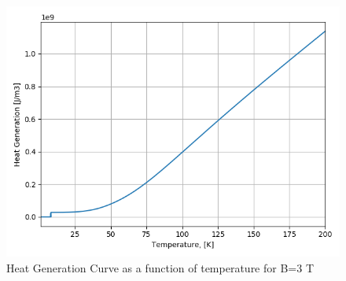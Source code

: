 \begin{figure}[ht!]
\centering
\includegraphics[width=0.49\linewidth]{figures/skew_quad_bcs/magnetic_field_mapping/Heat_Generation_Curve_B_3.png}
\caption{Heat Generation Curve as a function of temperature for B=3 T}
\label{fig:H_gen_curve}
\end{figure}